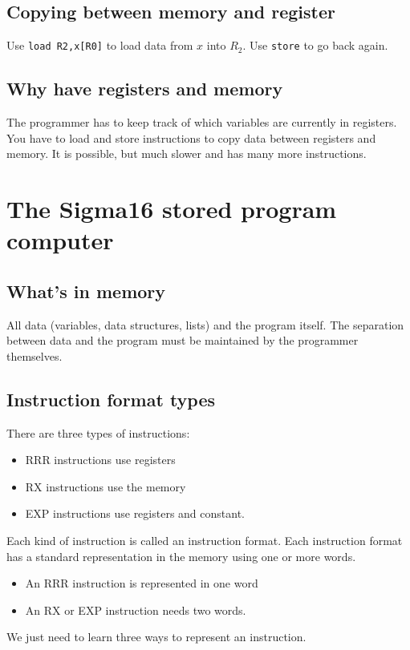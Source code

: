 \subsection{Copying between memory and register}\label{sub:copying_between_memory_and_register}

Use \texttt{load R2,x[R0]}  to load data from \(x\) into \(R_2\).
Use \texttt{store} to go back again.


\subsection{Why have registers and memory}\label{sub:why_have_registers_and_memory}

The programmer has to keep track of which variables are currently in registers.
You have to load and store instructions to copy data between registers and memory.
It is possible, but much slower and has many more instructions.

\section{The Sigma16 stored program computer}\label{sec:the_sigma16_stored_program_computer}

\subsection{What's in memory}\label{sub:what_s_in_memory}

All data (variables, data structures, lists) and the program itself.
The separation between data and the program must be maintained by the programmer themselves.

\subsection{Instruction format types}\label{sub:instruction_format_types}

There are three types of instructions:
\begin{itemize}
	\item RRR instructions use registers
	\item RX instructions use the memory
	\item EXP instructions use registers and constant.
\end{itemize}

%
Each kind of instruction is called an instruction format.
Each instruction format has a standard representation in the memory using one or more words.
\begin{itemize}
	\item An RRR instruction is represented in one word
	\item An RX or EXP instruction needs two words.
\end{itemize}
%
We just need to learn three ways to represent an instruction.

